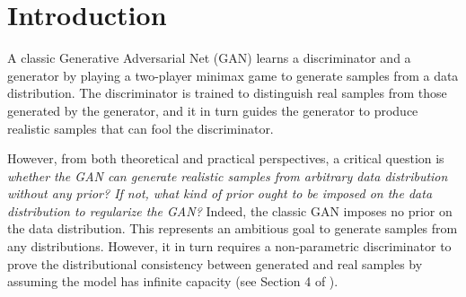 %

\section{Introduction}

A classic Generative Adversarial Net (GAN) \cite{goodfellow2014generative} learns a discriminator and a generator by playing a two-player minimax game to generate samples from a data distribution. The discriminator is trained to distinguish real samples from those generated by the generator, and it in turn guides the generator to produce realistic samples that can fool the discriminator.




However, from both theoretical and practical perspectives, a critical question is {\em whether the GAN can generate realistic samples from arbitrary data distribution without any prior? If not, what kind of prior ought to be imposed on the data distribution to regularize the GAN?} Indeed,
the classic GAN \cite{goodfellow2014generative} imposes no prior on the data distribution.  This represents an ambitious goal to
generate samples from any distributions. However, it in turn requires a non-parametric discriminator to prove the distributional consistency between generated and real samples by assuming the model has infinite capacity (see Section 4 of \cite{goodfellow2014generative}).

